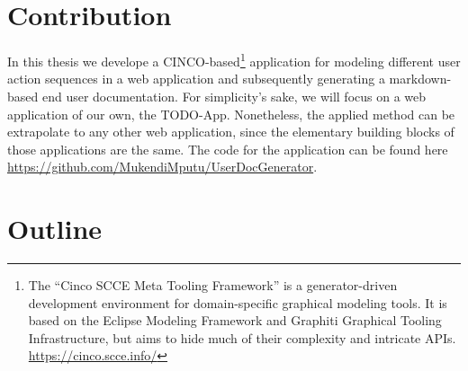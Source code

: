 \section{Contribution}
In this thesis we develope a CINCO-based\footnote{The “Cinco SCCE Meta Tooling Framework” is a generator-driven development environment for domain-specific graphical modeling tools. It is based on the Eclipse Modeling Framework and Graphiti Graphical Tooling Infrastructure, but aims to hide much of their complexity and intricate APIs. \url{https://cinco.scce.info/}} application for modeling different user action sequences in a web application and subsequently generating a markdown-based end user documentation. For simplicity's sake, we will focus on a web application of our own, the TODO-App. Nonetheless, the applied method can be extrapolate to any other web application, since the elementary building blocks of those applications are the same. The code for the application can be found here \url{https://github.com/MukendiMputu/UserDocGenerator}. 
\section{Outline}